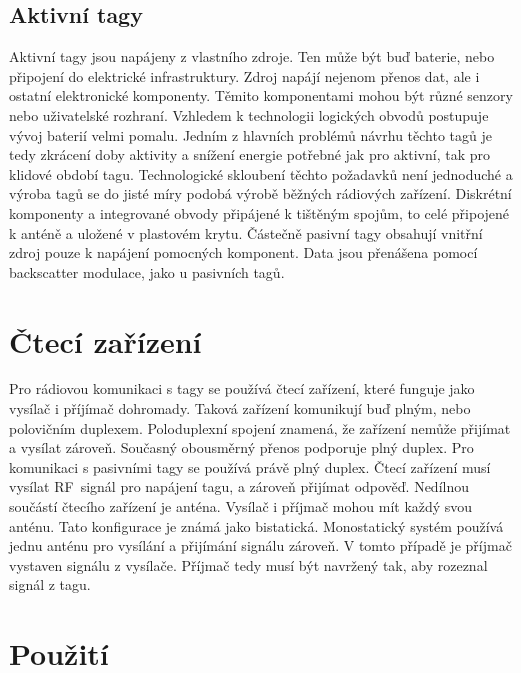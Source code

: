 \subsection{Aktivní tagy} %
Aktivní tagy jsou napájeny z vlastního zdroje. Ten může být buď baterie, nebo připojení do elektrické infrastruktury. Zdroj napájí nejenom přenos dat, ale i ostatní elektronické komponenty. Těmito komponentami mohou být různé senzory nebo uživatelské rozhraní\cite{RFID_explained}. Vzhledem k technologii logických obvodů postupuje vývoj baterií velmi pomalu. Jedním z hlavních problémů návrhu těchto tagů je tedy zkrácení doby aktivity a snížení energie potřebné jak pro aktivní, tak pro klidové období tagu. Technologické skloubení těchto požadavků není jednoduché a výroba tagů se do jisté míry podobá výrobě běžných rádiových zařízení. Diskrétní komponenty a integrované obvody připájené k tištěným spojům, to celé připojené k anténě a uložené v plastovém krytu\cite{The_RF_in_RFID}. 
Částečně pasivní tagy obsahují vnitřní zdroj pouze k napájení pomocných komponent. Data jsou přenášena pomocí backscatter modulace, jako u pasivních tagů\cite{Survey_of_RFID_Tags}.


\section{Čtecí zařízení}
Pro rádiovou komunikaci s tagy se používá čtecí zařízení, které funguje jako vysílač i příjímač dohromady. Taková zařízení komunikují buď plným, nebo polovičním duplexem. Poloduplexní spojení znamená, že zařízení nemůže přijímat a vysílat zároveň. Současný obousměrný přenos podporuje plný duplex. Pro komunikaci s pasivními tagy se používá právě plný duplex. Čtecí zařízení musí vysílat RF~signál pro napájení tagu, a zároveň přijímat odpověď.
Nedílnou součástí čtecího zařízení je anténa. Vysílač i příjmač mohou mít každý svou anténu. Tato konfigurace je známá jako bistatická. Monostatický systém používá jednu anténu pro vysílání a přijímání signálu zároveň. V tomto případě je příjmač vystaven signálu z vysílače. Příjmač tedy musí být navržený tak, aby rozeznal signál z tagu\cite{The_RF_in_RFID}.\par

\section{Použití}

              
